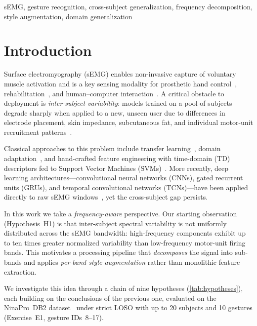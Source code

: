 \documentclass[conference]{IEEEtran}
\begin{document}
\begin{IEEEkeywords}
sEMG, gesture recognition, cross-subject generalization, frequency decomposition, style augmentation, domain generalization
\end{IEEEkeywords}

\section{Introduction}
\label{sec:intro}

Surface electromyography (sEMG) enables non-invasive capture of voluntary muscle activation and is a key sensing modality for prosthetic hand control~\cite{atzori2016deep}, rehabilitation~\cite{farina2014extraction}, and human--computer interaction~\cite{saponas2009enabling}.
A critical obstacle to deployment is \emph{inter-subject variability}: models trained on a pool of subjects degrade sharply when applied to a new, unseen user due to differences in electrode placement, skin impedance, subcutaneous fat, and individual motor-unit recruitment patterns~\cite{campbell2020current}.

Classical approaches to this problem include transfer learning~\cite{cote2019deep}, domain adaptation~\cite{du2017surface}, and hand-crafted feature engineering with time-domain (TD) descriptors fed to Support Vector Machines (SVMs)~\cite{phinyomark2012feature}.
More recently, deep learning architectures---convolutional neural networks (CNNs), gated recurrent units (GRUs), and temporal convolutional networks (TCNs)---have been applied directly to raw sEMG windows~\cite{atzori2016deep, cote2019deep}, yet the cross-subject gap persists.

In this work we take a \emph{frequency-aware} perspective.
Our starting observation (Hypothesis~H1) is that inter-subject spectral variability is not uniformly distributed across the sEMG bandwidth: high-frequency components exhibit up to ten times greater normalized variability than low-frequency motor-unit firing bands.
This motivates a processing pipeline that \emph{decomposes} the signal into sub-bands and applies \emph{per-band style augmentation} rather than monolithic feature extraction.

We investigate this idea through a chain of nine hypotheses (\cref{tab:hypotheses}), each building on the conclusions of the previous one, evaluated on the NinaPro~DB2 dataset~\cite{atzori2014electromyography} under strict LOSO with up to 20 subjects and 10 gestures (Exercise~E1, gesture IDs~8--17).
\end{document}
